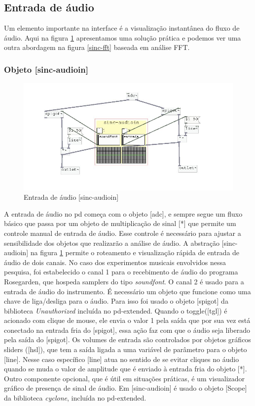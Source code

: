 \documentclass{ppgmus}
\begin{document}
\subsection{Entrada de áudio}

Um elemento importante na interface é a visualização instantânea
do fluxo de áudio. Aqui na figura \ref{audioin} apresentamos uma solução prática e podemos
ver uma outra abordagem na figura \ref{sinc-fft} baseada em análise FFT.

\subsubsection{Objeto [sinc-audioin]}


\begin{figure}
\includegraphics[scale=.55]{audioin}
\caption{Entrada de áudio [sinc-audioin]}
\label{audioin}
\end{figure}

A entrada de áudio no pd começa com o objeto  [adc\texttildelow], e sempre segue um fluxo
básico que passa por um objeto de multiplicação de sinal [*\texttildelow] que permite um
controle manual de entrada de áudio. Esse controle é necessário para ajustar 
a sensibilidade dos objetos que realizarão a análise de áudio. A abstração 
[sinc-audioin] na figura \ref{audioin} permite o roteamento e visualização rápida 
de entrada de áudio de dois canais. No caso dos experimentos musicais envolvidos 
nessa pesquisa, foi estabelecido o canal 1 para o recebimento de áudio do programa 
Rosegarden, que hospeda samplers do tipo \textit{soundfont}. O canal 2 é usado para 
a entrada de áudio do instrumento. É necessário um objeto que funcione como uma chave de
liga/desliga para o áudio. Para isso foi usado o objeto [spigot\texttildelow] da biblioteca
\textit{Unauthorized} incluída no pd-extended.
 Quando o toggle([tgl]) é acionado com clique de mouse,
ele envia o valor 1 pela saída que por sua vez está conectado na entrada fria do
[spigot\texttildelow], essa ação faz com que o áudio seja liberado pela saída do [spigot\texttildelow].
Os volumes de entrada são controlados por objetos gráficos sliders ([hsl]), que tem
a saída ligada a uma variável de parâmetro para o objeto [line\texttildelow]. Nesse caso específico
[line\texttildelow] atua no sentido de se evitar cliques no áudio quando se muda o valor de 
amplitude que é enviado à entrada fria do objeto [*\texttildelow]. Outro componente
opcional, que é útil em situações práticas, é um visualizador gráfico de presença de sinal
de áudio. Em [sinc-audioin] é usado o objeto [Scope\texttildelow] da biblioteca \textit{cyclone}, 
incluída no pd-extended.
\end{document}
